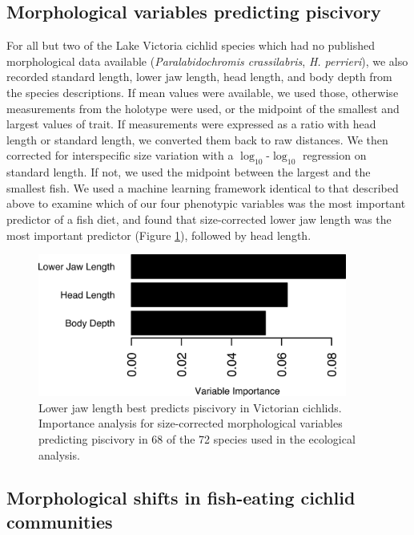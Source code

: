\subsection{Morphological variables predicting piscivory}

For all but two of the Lake Victoria cichlid species which had no published morphological data available ({\em Paralabidochromis crassilabris}, {\em H. perrieri}), we also recorded standard length, lower jaw length, head length, and body depth from the species descriptions. \cite{greenwood1981haplochromine, wagner2013genome, schwartz2006effects, hoyle1987effect, bates2010lme4, kuznetsova2013lmertest, redlist, witte1980haplochromine, hoogerhoud1982ecological, van1991systematic, van1992haplochromis, van1996taxonomical, seehausen1996lake} If mean values were available, we used those, otherwise measurements from the holotype were used, or the midpoint of the smallest and largest values of trait. If measurements were expressed as a ratio with head length or standard length, we converted them back to raw distances. We then corrected for interspecific size variation with a $\log_{10}$-$\log_{10}$ regression on standard length. If not, we used the midpoint between the largest and the smallest fish. We used a machine learning framework identical to that described above to examine which of our four phenotypic variables was the most important predictor of a fish diet, and found that size-corrected lower jaw length was the most important predictor (Figure \ref{FJ_fig6}), followed by head length. 

\begin{figure}
    \centering
    \includegraphics[width=4in]{FishJaws/figures/fig6}
    \caption{Lower jaw length best predicts piscivory in Victorian cichlids. Importance analysis for size-corrected morphological variables predicting piscivory in 68 of the 72 species used in the ecological analysis.}
    \label{FJ_fig6}
\end{figure}

\subsection{Morphological shifts in fish-eating cichlid communities}

